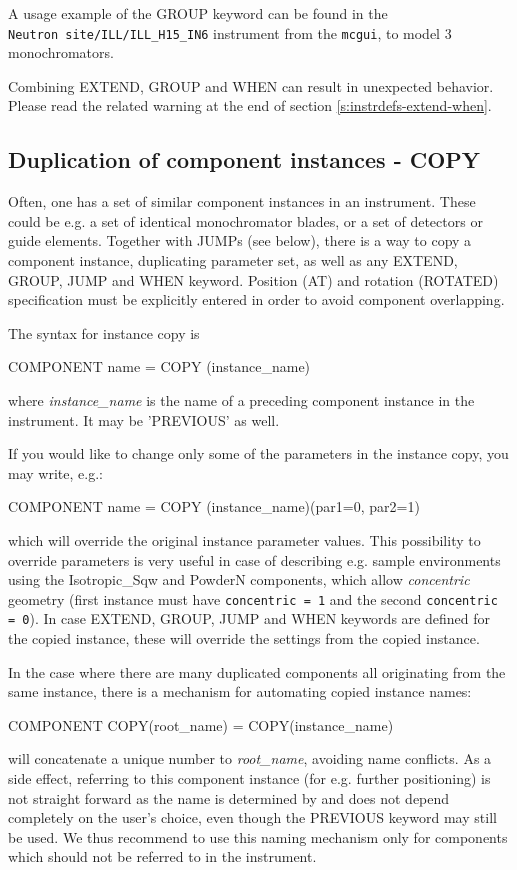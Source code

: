 A usage example of the GROUP keyword can be found in the \\
\verb+Neutron site/ILL/ILL_H15_IN6+ instrument from the \verb+mcgui+, to model 3 monochromators.

Combining EXTEND, GROUP and WHEN can result in unexpected behavior. Please read the related warning at the end of section \ref{s:instrdefs-extend-when}.

\subsection{Duplication of component instances - COPY}
\label{s:instrdefs-extend-copy}

Often, one has a set of similar component instances in an instrument. These
could be e.g. a set of identical monochromator blades, or a set of detectors or
guide elements.  Together with JUMPs (see below), there is a way to copy a
component instance, duplicating parameter set, as well as any EXTEND, GROUP,
JUMP and WHEN keyword.  Position (AT) and rotation (ROTATED) specification must
be explicitly entered in order to avoid component overlapping.

The syntax for instance copy is
\begin{mcstas}
COMPONENT name = COPY (instance_name)
\end{mcstas}
where \textit{instance\_name} is the name of a preceding component instance in the
instrument. It may be 'PREVIOUS' as well.

If you would like to change only some of the parameters in the instance copy, you may write, e.g.:

\begin{mcstas}
COMPONENT name = COPY (instance_name)(par1=0, par2=1)
\end{mcstas}

which will override the original instance parameter values. This possibility to
override parameters is very useful in case of describing e.g. sample environments
using the Isotropic\_Sqw and PowderN components, which allow \emph{concentric}
geometry (first instance must have \verb+concentric = 1+ and the second
\verb+concentric = 0+). In case EXTEND, GROUP, JUMP and WHEN keywords are
defined for the copied instance, these will override the settings from the
copied instance.


In the case where there are many duplicated components all originating from the
same instance, there is a mechanism for automating copied instance names:
\begin{mcstas}
COMPONENT COPY(root_name) = COPY(instance_name)
\end{mcstas}
will concatenate a unique number to \textit{root\_name}, avoiding name
conflicts. As a side effect, referring to this component instance (for
e.g. further positioning) is not straight forward as the name is determined by
\MCS and does not depend completely on the user's choice, even though the
PREVIOUS keyword may still be used. We thus recommend to use this naming
mechanism only for components which should not be referred to in the instrument.

